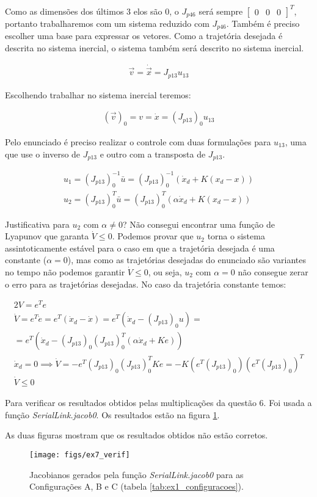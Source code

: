 \documentclass[a4paper,11pt]{article}
\theoremstyle{mytheor}
\begin{document}
Como as dimensões dos últimos 3 elos são 0, o $J_{p46}$ será sempre $\begin{bmatrix}0 & 0 & 0\end{bmatrix}^T$, portanto trabalharemos com um sistema reduzido com $J_{p46}$. Também é preciso escolher uma base para expressar os vetores. Como a trajetória desejada é descrita no sistema inercial, o sistema também será descrito no sistema inercial.

\begin{gather*}
\vec{v} = \dot{\vec{x}} = J_{p13}u_{13}
\end{gather*}

Escolhendo trabalhar no sistema inercial teremos:

\begin{gather*}
(\vec{v})_0 = v = \dot{x} = (J_{p13})_0u_{13}
\end{gather*}

Pelo enunciado é preciso realizar o controle com duas formulações para $u_{13}$, uma que use o inverso de $J_{p13}$ e outro com a transposta de $J_{p13}$.

\begin{gather*}
u_{1} = (J_{p13})_0^{-1}\bar{u} = (J_{p13})_0^{-1}(\dot{x}_d + K(x_d - x)) \\
u_{2} = (J_{p13})_0^T\bar{u} = (J_{p13})_0^T(\alpha\dot{x}_d + K(x_d - x))
\end{gather*}

Justificativa para $u_{2}$ com $\alpha \neq 0$? Não consegui encontrar uma função de Lyapunov que garanta $\dot{V} \leq 0$. Podemos provar que $u_{2}$ torna o sistema assintoticamente estável para o caso em que a trajetória desejada é uma constante ($\alpha = 0$), mas como as trajetórias desejadas do enunciado são variantes no tempo  não podemos garantir $\dot{V} \leq 0$, ou seja, $u_{2}$ com $\alpha = 0$ não consegue zerar o erro para as trajetórias desejadas. No caso da trajetória constante temos:

\begin{gather*}
2V = e^Te \\
\dot{V} = e^T\dot{e} = e^T(\dot{x}_d - \dot{x}) = e^T(\dot{x}_d - (J_{p13})_0u) = \\ = e^T(\dot{x}_d - (J_{p13})_0(J_{p13})_0^T(\alpha \dot{x}_d + Ke)) \\
\dot{x}_d = 0 \implies \dot{V} = -e^T(J_{p13})_0(J_{p13})_0^TKe = -K(e^T(J_{p13})_0)(e^T(J_{p13})_0)^T \\
\dot{V} \leq 0
\end{gather*}


Para verificar os resultados obtidos pelas multiplicações da questão 6. Foi usada a função \textit{SerialLink.jacob0}. Os resultados estão na figura \ref{fig:ex6_verif}.

As duas figuras mostram que os resultados obtidos não estão corretos.

\begin{figure}[!ht]
\centering
\caption{Jacobianos gerados pela função \textit{SerialLink.jacob0} para as Configurações A, B e C (tabela \ref{tab:ex1_configuracoes}).}
\texttt{[image: figs/ex7\_verif]}
\label{fig:ex6_verif}
\end{figure}
\end{document}
